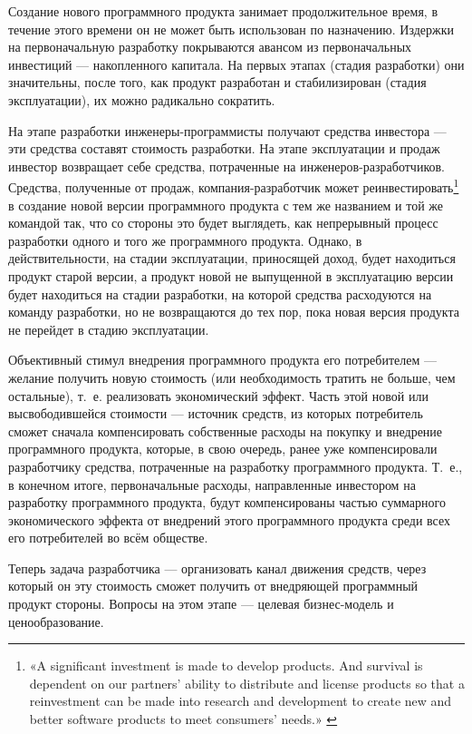 \documentclass{article}
\begin{document}
Создание нового программного продукта занимает продолжительное время, в течение этого времени он не может быть использован по назначению. Издержки на первоначальную разработку покрываются авансом из первоначальных инвестиций — накопленного капитала. На первых этапах (стадия разработки) они значительны, после того, как продукт разработан и стабилизирован (стадия эксплуатации), их можно радикально сократить.

На этапе разработки инженеры-программисты получают средства инвестора — эти средства составят стоимость разработки. На этапе эксплуатации и продаж инвестор возвращает себе средства, потраченные на инженеров-разработчиков. Средства, полученные от продаж, компания-разработчик может реинвестировать\footnote{«A significant investment is made to develop products. And survival is dependent on our partners’ ability to distribute and license products so that a reinvestment can be made into research and development to create new and better software products to meet consumers’ needs.» \cite{microsoftPiracyReinvest}} в создание новой версии программного продукта с тем же названием и той же командой так, что со стороны это будет выглядеть, как непрерывный процесс разработки одного и того же программного продукта. Однако, в действительности, на стадии эксплуатации, приносящей доход, будет находиться продукт старой версии, а продукт новой не выпущенной в эксплуатацию версии будет находиться на стадии разработки, на которой средства расходуются на команду разработки, но не возвращаются до тех пор, пока новая версия продукта не перейдет в стадию эксплуатации.

Объективный стимул внедрения программного продукта его потребителем — желание получить новую стоимость (или необходимость тратить не больше, чем остальные), т.~е. реализовать экономический эффект. Часть этой новой или высвободившейся стоимости — источник средств, из которых потребитель сможет сначала компенсировать собственные расходы на покупку и внедрение программного продукта, которые, в свою очередь, ранее уже компенсировали разработчику средства, потраченные на разработку программного продукта. Т.~е., в конечном итоге, первоначальные расходы, направленные инвестором на разработку программного продукта, будут компенсированы частью суммарного экономического эффекта от внедрений этого программного продукта среди всех его потребителей во всём обществе.

Теперь задача разработчика — организовать канал движения средств, через который он эту стоимость сможет получить от внедряющей программный продукт стороны. Вопросы на этом этапе — целевая бизнес-модель и ценообразование.
\end{document}
